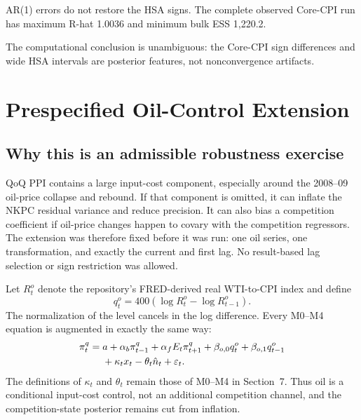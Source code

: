 \documentclass[11pt]{article}
\newcommand{\Nhat}{\hat n}
\begin{document}
AR(1) errors do not restore the HSA signs. The complete observed Core-CPI run has maximum
R-hat 1.0036 and minimum bulk ESS 1,220.2.

\begin{table}[H]
\centering
\caption{Core CPI observed IID convergence}
\scriptsize

\end{table}

The computational conclusion is unambiguous: the Core-CPI sign differences and wide HSA
intervals are posterior features, not nonconvergence artifacts.

\section{Prespecified Oil-Control Extension}

\subsection{Why this is an admissible robustness exercise}

QoQ PPI contains a large input-cost component, especially around the 2008--09 oil-price
collapse and rebound. If that component is omitted, it can inflate the NKPC residual variance
and reduce precision. It can also bias a competition coefficient if oil-price changes happen
to covary with the competition regressors. The extension was therefore fixed before it was
run: one oil series, one transformation, and exactly the current and first lag. No result-based
lag selection or sign restriction was allowed.

Let $R_t^o$ denote the repository's FRED-derived real WTI-to-CPI index and define
\begin{equation}
q_t^o=400\left(\log R_t^o-\log R_{t-1}^o\right).
\label{eq:oil}
\end{equation}
The normalization of the level cancels in the log difference. Every M0--M4 equation is
augmented in exactly the same way:
\begin{align}
\pi_t^q={}&a+\alpha_b\pi_{t-1}^q+\alpha_fE_t\pi_{t+1}^q
+\beta_{o,0}q_t^o+\beta_{o,1}q_{t-1}^o \notag\\
&+\kappa_t x_t-\theta_t\Nhat_t+\varepsilon_t.
\label{eq:oil_nkpc}
\end{align}
The definitions of $\kappa_t$ and $\theta_t$ remain those of M0--M4 in Section~7. Thus oil
is a conditional input-cost control, not an additional competition channel, and the
competition-state posterior remains cut from inflation.
\end{document}
